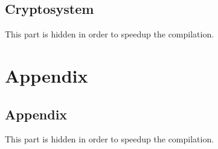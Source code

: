 \documentclass{report}
\theoremstyle{break}
\begin{document}
		\chapter{Cryptosystem}
		    This part is hidden in order to speedup the compilation.
	
	\part{Appendix}
		\chapter{Appendix}
		    This part is hidden in order to speedup the compilation.
\end{document}
